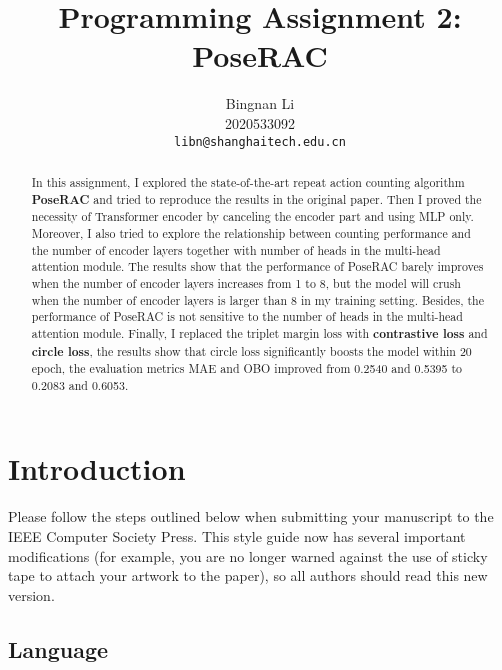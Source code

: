 \documentclass[10pt,twocolumn,letterpaper]{article}
\begin{document}
    \title{Programming Assignment 2: PoseRAC}

    \author{Bingnan Li\\
    2020533092\\
    {\tt\small libn@shanghaitech.edu.cn}
    }
    \maketitle

    \begin{abstract}
        In this assignment, I explored the state-of-the-art repeat action counting algorithm {\bf PoseRAC} and tried to
        reproduce the results in the original paper.
        Then I proved the necessity of Transformer encoder by canceling the encoder part and using MLP only.
        Moreover, I also tried to explore the relationship between counting performance and the number of encoder layers
        together with number of heads in the multi-head attention module.
        The results show that the performance of PoseRAC barely improves when the number of encoder layers increases from 1 to 8,
        but the model will crush when the number of encoder layers is larger than 8 in my training setting.
        Besides, the performance of PoseRAC is not sensitive to the number of heads in the multi-head attention module.
        Finally, I replaced the triplet margin loss with {\bf contrastive loss} and {\bf circle loss}, the results show that
        circle loss significantly boosts the model within 20 epoch, the evaluation metrics MAE and OBO improved from 0.2540 and 0.5395 to 0.2083 and 0.6053.
    \end{abstract}



    \section{Introduction}
    \label{sec:intro}

    Please follow the steps outlined below when submitting your manuscript to the IEEE Computer Society Press.
    This style guide now has several important modifications (for example, you are no longer warned against the use of sticky tape to attach your artwork to the paper), so all authors should read this new version.


    \subsection{Language}
\end{document}
